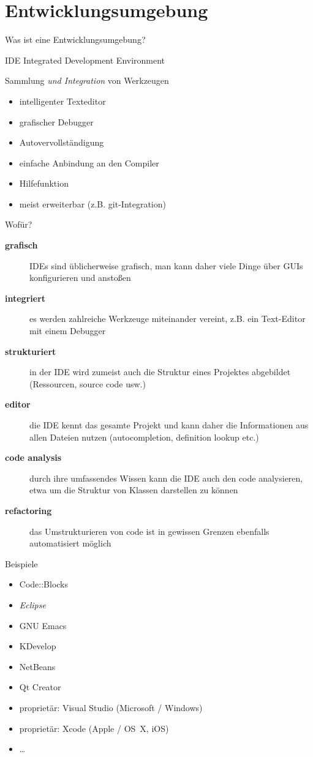 \section{Entwicklungsumgebung}
\begin{frame}{Was ist eine Entwicklungsumgebung?}
	\begin{block}{IDE}
		Integrated Development Environment
	\end{block}
	\pause
	\begin{block}{Sammlung \emph{und Integration} von Werkzeugen}
		\begin{itemize}
			\item intelligenter Texteditor
			\item grafischer Debugger
			\item Autovervollständigung
			\item einfache Anbindung an den Compiler
			\item Hilfefunktion
			\item meist erweiterbar (z.B. git-Integration)
		\end{itemize}
	\end{block}
\end{frame}

\begin{frame}{Wofür?}
	\begin{description}
		\item[\textbf{grafisch}] IDEs sind üblicherweise grafisch, man kann daher viele Dinge über GUIs konfigurieren und anstoßen
		\item[\textbf{integriert}] es werden zahlreiche Werkzeuge miteinander vereint, z.B. ein Text-Editor mit einem Debugger
		\item[\textbf{strukturiert}] in der IDE wird zumeist auch die Struktur eines Projektes abgebildet (Ressourcen, source code usw.)
		\item[\textbf{editor}] die IDE kennt das gesamte Projekt und kann daher die Informationen aus allen Dateien nutzen (autocompletion, definition lookup etc.)
		\item[\textbf{code analysis}] durch ihre umfassendes Wissen kann die IDE auch den code analysieren, etwa um die Struktur von Klassen darstellen zu können
		\item[\textbf{refactoring}] das Umstrukturieren von code ist in gewissen Grenzen ebenfalls automatisiert möglich
	\end{description}
\end{frame}

\begin{frame}{Beispiele}
	\begin{itemize}
		\item Code::Blocks
		\item \emph{Eclipse}
		\item GNU Emacs
		\item KDevelop
		\item NetBeans
		\item Qt Creator
		\item proprietär: Visual Studio (Microsoft / Windows)
		\item proprietär: Xcode (Apple / OS~X, iOS)
		\item \dots
	\end{itemize}
\end{frame}